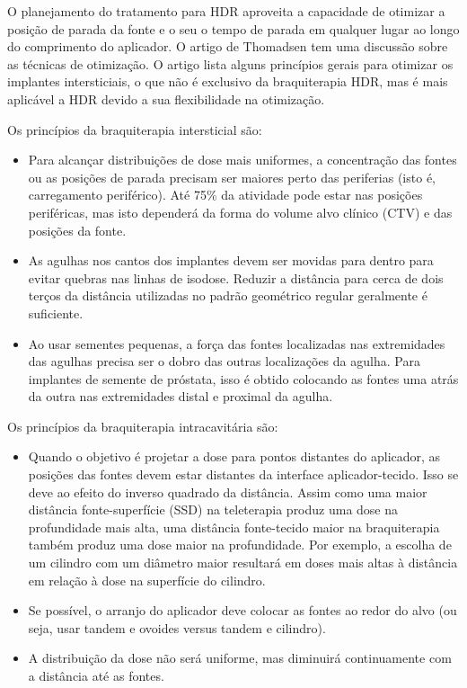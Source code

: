 \documentclass[11pt,a4paper]{article}
\newcounter{exemplo}
\begin{document}
	O planejamento do tratamento para HDR aproveita a capacidade de otimizar a posição de parada da fonte e o seu o tempo de parada em qualquer lugar ao longo do comprimento do aplicador. O artigo de Thomadsen\cite{thomadsen2008anniversary} tem uma discussão sobre as técnicas de otimização. O artigo lista alguns princípios gerais para otimizar os implantes intersticiais, o que não é exclusivo da braquiterapia HDR, mas é mais aplicável a HDR devido a sua flexibilidade na otimização. 
	
	Os princípios da braquiterapia intersticial são:

	\begin{itemize}[label=\textcolor{CarnationPink}{$\blacktriangleright$}]
		\item Para alcançar distribuições de dose mais uniformes, a concentração das fontes ou as posições de parada precisam ser maiores perto das periferias (isto é, carregamento periférico). Até 75\% da atividade pode estar nas posições periféricas, mas isto dependerá da forma do volume alvo clínico (CTV) e das posições da fonte.
		\item As agulhas nos cantos dos implantes devem ser movidas para dentro para evitar quebras nas linhas de isodose. Reduzir a distância para cerca de dois terços da distância utilizadas no padrão geométrico regular geralmente é suficiente.
		\item Ao usar sementes pequenas, a força das fontes localizadas nas extremidades das agulhas precisa ser o dobro das outras localizações da agulha. Para implantes de semente de próstata, isso é obtido colocando as fontes uma atrás da outra nas extremidades distal e proximal da agulha.
	\end{itemize}

	Os princípios da braquiterapia intracavitária são:

	\begin{itemize}[label=\textcolor{CarnationPink}{$\blacktriangleright$}]
		\item Quando o objetivo é projetar a dose para pontos distantes do aplicador, as posições das fontes devem estar distantes da interface aplicador-tecido. Isso se deve ao efeito do inverso quadrado da distância. Assim como uma maior distância fonte-superfície (SSD) na teleterapia produz uma dose na profundidade mais alta, uma distância fonte-tecido maior na braquiterapia também produz uma dose maior na profundidade. Por exemplo, a escolha de um cilindro com um diâmetro maior resultará em doses mais altas à distância em relação à dose na superfície do cilindro.
		\item Se possível, o arranjo do aplicador deve colocar as fontes ao redor do alvo (ou seja, usar tandem e ovoides versus tandem e cilindro).
		\item A distribuição da dose não será uniforme, mas diminuirá continuamente com a distância até as fontes.
	\end{itemize}
\end{document}
